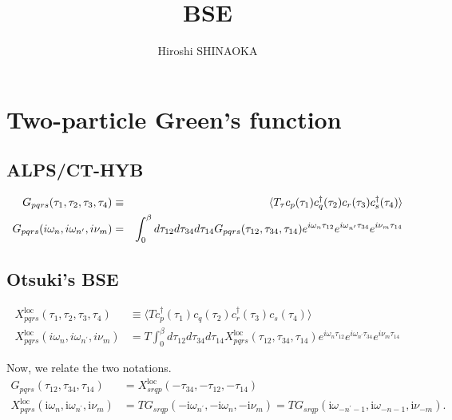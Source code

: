 \documentclass[disablejfam,12pt]{article}
\author{Hiroshi SHINAOKA}
\newcommand{\mi}{\ensuremath{\mathrm{i}}}
\begin{document}
\title{BSE}
\maketitle
\thispagestyle{empty}



\section{Two-particle Green's function}

\subsection{ALPS/CT-HYB}
\begin{eqnarray}
 G_{pqrs}(\tau_1, \tau_2, \tau_3, \tau_4) &\equiv& \braket{T_\tau c_p(\tau_1) c_q^\dagger(\tau_2) c_r(\tau_3) c_s^\dagger(\tau_4)}\\
 G_{pqrs}(i \omega_n, i \omega_{n^\prime}, i\nu_m) &=& \int_0^\beta  d \tau_{12} d \tau_{34} d \tau_{14} G_{pqrs}(\tau_{12}, \tau_{34}, \tau_{14}) e^{i\omega_n \tau_{12}} e^{i\omega_{n^\prime} \tau_{34}}e^{i \nu_m \tau_{14}}
\end{eqnarray}

\subsection{Otsuki's BSE}

\begin{align}
X^\mathrm{loc}_{pqrs}(\tau_1, \tau_2, \tau_3, \tau_4) &\equiv \langle T c^\dagger_p(\tau_1) c_q(\tau_2) c^\dagger_r(\tau_3) c_s(\tau_4)\rangle\nonumber\\
X^\mathrm{loc}_{pqrs}(i \omega_n, i \omega_{n^\prime}, i\nu_m) &= T \int_0^\beta  d \tau_{12} d \tau_{34} d \tau_{14} X^\mathrm{loc}_{pqrs}(\tau_{12}, \tau_{34}, \tau_{14}) e^{i\omega_n \tau_{12}} e^{i\omega_{n^\prime} \tau_{34}}e^{i \nu_m \tau_{14}}
\end{align}

Now, we relate the two notations.
\begin{align}
G_{pqrs}(\tau_{12}, \tau_{34}, \tau_{14}) &= X^\mathrm{loc}_{srqp}(-\tau_{34}, -\tau_{12}, -\tau_{14})\\
X^\mathrm{loc}_{pqrs}(\mi \omega_n, \mi \omega_{n^\prime}, \mi \nu_m) &= T G_{srqp}(-\mi \omega_{n^\prime}, -\mi \omega_n, -\mi \nu_m) = T G_{srqp}(\mi \omega_{-n^\prime-1}, \mi \omega_{-n-1}, \mi \nu_{-m}).
\end{align}
\end{document}
